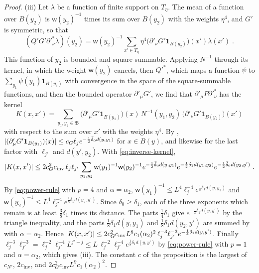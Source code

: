 \documentclass[11pt]{preprint}
\DeclarePairedDelimiter{\abs}{\lvert}{\rvert}
\numberwithin{equation}{section}
\theoremstyle{definition}
\theoremstyle{remark}
\theoremstyle{plain}
\begin{document}
\begin{proof}
(iii) Let $\lambda$ be a function of finite support on $T_\eta$. The mean of a function over $B(y_2)$ is $\mathsf w(y_2)^{-1}$ times its sum over $B(y_2)$ with the weights $\eta^4$, and $G'$ is symmetric, so that
\begin{equation}\label{eq:projection-first-factor}
    (Q'G'\partial'^*_\nu\lambda)(y_2) = \mathsf w(y_2)^{-1}\sum_{x' \in T_\eta}\eta^4\bigl(\partial'_\nu G'\mathbf 1_{B(y_2)}\bigr)(x')\lambda(x')\;.
\end{equation}
This function of $y_2$ is bounded and square-summable. Applying $N^{-1}$ through its kernel, in which the weight $\mathsf w(y_2)$ cancels, then $Q'^*$, which maps a function $\psi$ to $\sum_{y_1}\psi(y_1)\mathbf 1_{B(y_1)}$ with convergence in the space of the square-summable functions, and then the bounded operator $\partial'_\mu G'$, we find that $\partial'_\mu P\partial'^*_\nu$ has the kernel
\begin{equation}\label{eq:projection-kernel-sequence}
    K(x, x') = \sum_{y_1, y_2 \in \mathfrak B}\bigl(\partial'_\mu G'\mathbf 1_{B(y_1)}\bigr)(x)\,N^{-1}(y_1, y_2)\,\bigl(\partial'_\nu G'\mathbf 1_{B(y_2)}\bigr)(x')
\end{equation}
with respect to the sum over $x'$ with the weights $\eta^4$. By \cite[(2.67)]{BalabanPRT2}, $\abs{(\partial'_\mu G'\mathbf 1_{B(y_1)})(x)} \leq c_G\ell_je^{-\frac12\bar\delta_0d(y, y_1)}$ for $x \in B(y)$, and likewise for the last factor with $\ell_{j'}$ and $d(y', y_2)$. With \eqref{eq:inverse-kernel},
\begin{equation}\label{eq:projection-kernel-bound}
    \abs{K(x, x')} \leq 2c_G^2c_{\mathrm{inv}}\,\ell_j\ell_{j'}\sum_{y_1, y_2}\mathsf w(y_1)^{-1}\mathsf w(y_2)^{-1}e^{-\frac12\bar\delta_0d(y, y_1)}e^{-\frac12\delta_1d(y_1, y_2)}e^{-\frac12\bar\delta_0d(y_2, y')}\;.
\end{equation}
By \eqref{eq:power-rule} with $p = 4$ and $\alpha = \alpha_2$, $\mathsf w(y_1)^{-1} \leq L^4\ell_j^{-4}e^{\frac18\delta_1d(y, y_1)}$ and $\mathsf w(y_2)^{-1} \leq L^4\ell_{j'}^{-4}e^{\frac18\delta_1d(y_2, y')}$. Since $\bar\delta_0 \geq \delta_1$, each of the three exponents which remain is at least $\frac38\delta_1$ times its distance. The parts $\frac14\delta_1$ give $e^{-\frac14\delta_1d(y, y')}$ by the triangle inequality, and the parts $\frac18\delta_1d(y, y_1)$ and $\frac18\delta_1d(y_2, y')$ are summed by \cite[(2.61)]{BalabanPRT2} with $\alpha = \alpha_2$. Hence $\abs{K(x, x')} \leq 2c_G^2c_{\mathrm{inv}}L^8c_1(\alpha_2)^2\,\ell_j^{-3}\ell_{j'}^{-3}e^{-\frac14\delta_1d(y, y')}$. Finally $\ell_j^{-3}\ell_{j'}^{-3} = \ell_j^{-2}\ell_{j'}^{-4}L^{j' - j} \leq L\,\ell_j^{-2}\ell_{j'}^{-4}e^{\frac18\delta_1d(y, y')}$ by \eqref{eq:power-rule} with $p = 1$ and $\alpha = \alpha_2$, which gives (iii). The constant $c$ of the proposition is the largest of $c_{N'}$, $2c_{\mathrm{inv}}$, and $2c_G^2c_{\mathrm{inv}}L^9c_1(\alpha_2)^2$.
\end{proof}
\end{document}
